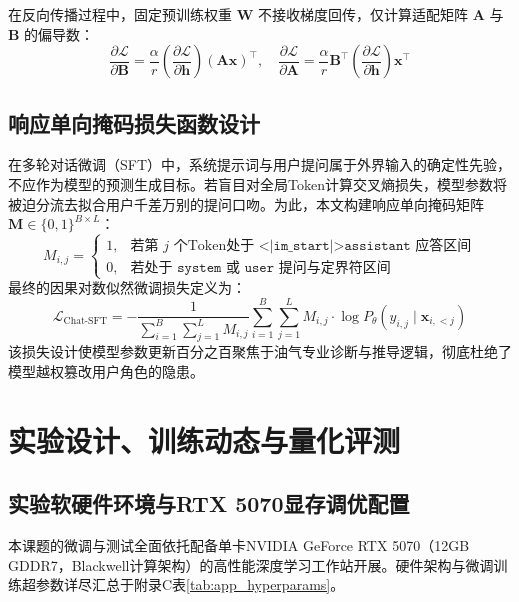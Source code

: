 \documentclass[UTF8,a4paper,zihao=-4,openany,twoside]{ctexbook}
\begin{document}
在反向传播过程中，固定预训练权重 $\mathbf{W}$ 不接收梯度回传，仅计算适配矩阵 $\mathbf{A}$ 与 $\mathbf{B}$ 的偏导数：
\begin{equation}
\frac{\partial \mathcal{L}}{\partial \mathbf{B}} = \frac{\alpha}{r} \left( \frac{\partial \mathcal{L}}{\partial \mathbf{h}} \right) (\mathbf{A} \mathbf{x})^\top, \quad \frac{\partial \mathcal{L}}{\partial \mathbf{A}} = \frac{\alpha}{r} \mathbf{B}^\top \left( \frac{\partial \mathcal{L}}{\partial \mathbf{h}} \right) \mathbf{x}^\top
\label{eq:lora_grad}
\end{equation}

\section{响应单向掩码损失函数设计}
在多轮对话微调（SFT）中，系统提示词与用户提问属于外界输入的确定性先验，不应作为模型的预测生成目标。若盲目对全局Token计算交叉熵损失，模型参数将被迫分流去拟合用户千差万别的提问口吻。为此，本文构建响应单向掩码矩阵 $\mathbf{M} \in \{0, 1\}^{B \times L}$：
\begin{equation}
M_{i, j} = \begin{cases}
1, & \text{若第 } j \text{ 个Token处于 } \texttt{<|im\_start|>assistant} \text{ 应答区间} \\
0, & \text{若处于 } \texttt{system} \text{ 或 } \texttt{user} \text{ 提问与定界符区间}
\end{cases}
\label{eq:response_mask}
\end{equation}
最终的因果对数似然微调损失定义为：
\begin{equation}
\mathcal{L}_{\text{Chat-SFT}} = - \frac{1}{\sum_{i=1}^B \sum_{j=1}^L M_{i,j}} \sum_{i=1}^B \sum_{j=1}^L M_{i,j} \cdot \log P_\theta(y_{i,j} \mid \mathbf{x}_{i, <j})
\label{eq:sft_loss}
\end{equation}
该损失设计使模型参数更新百分之百聚焦于油气专业诊断与推导逻辑，彻底杜绝了模型越权篡改用户角色的隐患。

\chapter{实验设计、训练动态与量化评测}

\section{实验软硬件环境与RTX 5070显存调优配置}
本课题的微调与测试全面依托配备单卡NVIDIA GeForce RTX 5070（12GB GDDR7，Blackwell计算架构）的高性能深度学习工作站开展。硬件架构与微调训练超参数详尽汇总于附录C表\ref{tab:app_hyperparams}。
\end{document}
